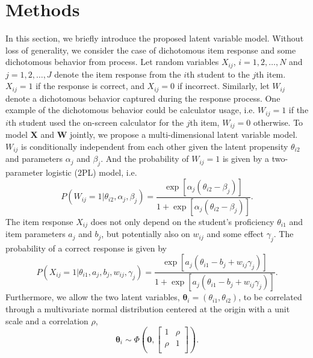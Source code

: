 \documentclass[11pt, letterpaper]{article}
\begin{document}
  \section{Methods}
  In this section, we briefly introduce the proposed latent variable model.
  Without loss of generality, we consider the case of dichotomous item
  response and some dichotomous behavior from process. Let random variables $X_
  {ij}$, $i = 1, 2, \dots, N$ and $j = 1, 2, \dots, J$ denote the item response
  from the $i$th student to the $j$th item. $X_{ij} = 1$ if the response is
  correct, and $X_{ij} = 0$ if incorrect. Similarly, let $W_{ij}$ denote a
  dichotomous behavior captured during the response process. One example of the
  dichotomous behavior could be calculator usage, i.e. $W_{ij} = 1$ if the $i$th
  student used the on-screen calculator for the $j$th item, $W_{ij} = 0$
  otherwise. To model $\bm{X}$ and $\bm{W}$ jointly, we propose a
  multi-dimensional latent variable model. $W_{ij}$ is conditionally independent
  from each other given the latent propensity $\theta_{i2}$ and parameters
  $\alpha_j$ and $\beta_j$. And the probability of $W_{ij} = 1$ is given by a
  two-parameter logistic (2PL) model, i.e.
  \begin{equation}
    P(W_{ij} = 1 | \theta_{i2}, \alpha_j, \beta_j) = \frac{\exp[\alpha_j 
    (\theta_{i2} - \beta_j)]}{1 + \exp[\alpha_j (\theta_{i2} - \beta_j)]}.
  \end{equation}
  The item response $X_{ij}$ does not only depend on the student's
  proficiency $\theta_{i1}$ and item parameters $a_j$ and $b_j$, but potentially
  also on $w_{ij}$ and some effect $\gamma_j$. The probability of a correct
  response is given by
  \begin{equation}
    P(X_{ij} = 1 | \theta_{i1}, a_j, b_j, w_{ij}, \gamma_j) = \frac{\exp[a_j
    (\theta_{i1} - b_j + w_{ij} \gamma_j)]}{1 + \exp[a_j(\theta_{i1} - b_j + w_
    {ij} \gamma_j)]}.
  \end{equation}
  Furthermore, we allow the two latent variables, $\bm{\theta}_i = (\theta_{i1},
  \theta_{i2})$, to be correlated through a multivariate normal distribution
  centered at the origin with a unit scale and a correlation $\rho$,
  \begin{equation}
    \bm{\theta}_i \sim \Phi\left(\bm{0}, 
    \begin{bmatrix}
    1 & \rho \\
    \rho & 1 \\
    \end{bmatrix}\right).
  \end{equation}
\end{document}
